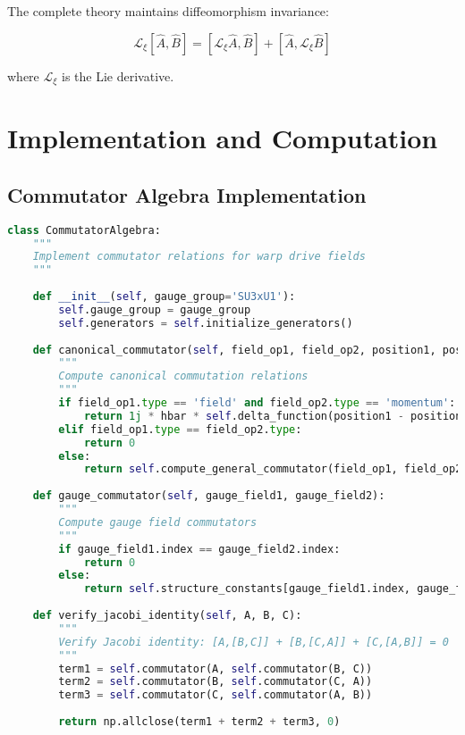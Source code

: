 \documentclass[12pt,a4paper]{article}
\begin{document}
The complete theory maintains diffeomorphism invariance:

\begin{equation}
\mathcal{L}_{\xi} [\hat{A}, \hat{B}] = [\mathcal{L}_{\xi} \hat{A}, \hat{B}] + [\hat{A}, \mathcal{L}_{\xi} \hat{B}]
\end{equation}

where $\mathcal{L}_{\xi}$ is the Lie derivative.

\section{Implementation and Computation}

\subsection{Commutator Algebra Implementation}

\begin{lstlisting}[language=Python]
class CommutatorAlgebra:
    """
    Implement commutator relations for warp drive fields
    """
    
    def __init__(self, gauge_group='SU3xU1'):
        self.gauge_group = gauge_group
        self.generators = self.initialize_generators()
        
    def canonical_commutator(self, field_op1, field_op2, position1, position2):
        """
        Compute canonical commutation relations
        """
        if field_op1.type == 'field' and field_op2.type == 'momentum':
            return 1j * hbar * self.delta_function(position1 - position2)
        elif field_op1.type == field_op2.type:
            return 0
        else:
            return self.compute_general_commutator(field_op1, field_op2)
    
    def gauge_commutator(self, gauge_field1, gauge_field2):
        """
        Compute gauge field commutators
        """
        if gauge_field1.index == gauge_field2.index:
            return 0
        else:
            return self.structure_constants[gauge_field1.index, gauge_field2.index]
    
    def verify_jacobi_identity(self, A, B, C):
        """
        Verify Jacobi identity: [A,[B,C]] + [B,[C,A]] + [C,[A,B]] = 0
        """
        term1 = self.commutator(A, self.commutator(B, C))
        term2 = self.commutator(B, self.commutator(C, A))
        term3 = self.commutator(C, self.commutator(A, B))
        
        return np.allclose(term1 + term2 + term3, 0)
\end{lstlisting}
\end{document}
